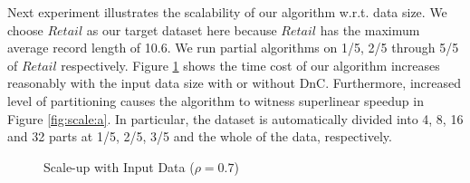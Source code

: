 Next experiment illustrates the scalability of our algorithm
w.r.t. data size. We choose $Retail$ as our target dataset here
because $Retail$ has the maximum average record length of 10.6.
We run partial algorithms on 1/5, 2/5 through 5/5 of $Retail$ respectively.
Figure \ref{fig:scale} shows 
the time cost of our algorithm increases reasonably with the 
input data size with or without DnC.
Furthermore, increased level of partitioning causes the algorithm to witness
superlinear speedup in Figure \ref{fig:scale:a}. In particular, the dataset is
automatically divided into 4, 8, 16 and 32 parts at 1/5, 2/5, 3/5 and
the whole of the data, respectively.
\begin{figure}[tb]
\centering
{}
\caption{Scale-up with Input Data ($\rho=0.7$)}\label{fig:scale}
\end{figure}

